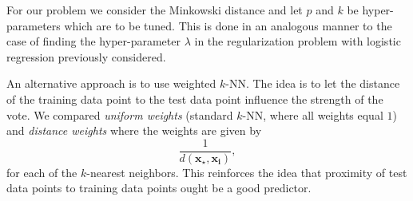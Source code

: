 \documentclass[../../project.tex]{subfiles}
\begin{document}
	For our problem we consider the Minkowski distance and let $p$ and $k$ be hyper-parameters which are to be tuned. This is done in an analogous manner to the case of finding the hyper-parameter $\lambda$ in the regularization problem with logistic regression previously considered.
	
	
	An alternative approach is to use weighted $k$-NN. The idea is to let the distance of the training data point to the test data point influence the strength of the vote. We compared \textit{uniform weights} (standard $k$-NN, where all weights equal $1$) and \textit{distance weights} where the weights are given by 
	\begin{equation}
	\dfrac{1}{d(\boldsymbol{x_{\star}, \boldsymbol{x_i}})}, 
	\end{equation}
	for each of the $k$-nearest neighbors. This reinforces the idea that proximity of test data points to training data points ought be a good predictor.\cite{sklearn2}
\end{document}
